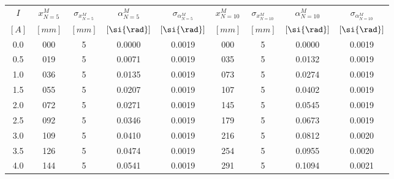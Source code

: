 \begin{tabular}{
    S[table-format=1.1]
    S[table-format=2.0]
    S[table-format=1.0]
    S[table-format=0.4]
    S[table-format=0.4]
    S[table-format=3.0]
    S[table-format=1.0]
    S[table-format=0.4]
    S[table-format=0.4]
} \toprule
{$I$}        & {$x^M_{N=5}$} & {$\sigma_{x^M_{N=5}}$} & {$\alpha^M_{N=5}$} & {$\sigma_{\alpha^M_{N=5}}$} & {$x^M_{N=10}$} & {$\sigma_{x^M_{N=10}}$} & {$\alpha^M_{N=10}$} & {$\sigma_{\alpha^M_{N=10}}$} \\
{$[\si{A}]$} & {$[\si{mm}]$} & {$[\si{mm}]$}          & {$[\si{\rad}]$}    & {$[\si{\rad}]$}             & {$[\si{mm}]$}  & {$[\si{mm}]$}           & {$[\si{\rad}]$}     & {$[\si{\rad}]$}              \\           & 000           & 5                      & 0.0000             & 0.0019                      & 000            & 5                       & 0.0000              & 0.0019                       \\
0.5          & 019           & 5                      & 0.0071             & 0.0019                      & 035            & 5                       & 0.0132              & 0.0019                       \\
1.0          & 036           & 5                      & 0.0135             & 0.0019                      & 073            & 5                       & 0.0274              & 0.0019                       \\
1.5          & 055           & 5                      & 0.0207             & 0.0019                      & 107            & 5                       & 0.0402              & 0.0019                       \\
2.0          & 072           & 5                      & 0.0271             & 0.0019                      & 145            & 5                       & 0.0545              & 0.0019                       \\
2.5          & 092           & 5                      & 0.0346             & 0.0019                      & 179            & 5                       & 0.0673              & 0.0019                       \\
3.0          & 109           & 5                      & 0.0410             & 0.0019                      & 216            & 5                       & 0.0812              & 0.0020                       \\
3.5          & 126           & 5                      & 0.0474             & 0.0019                      & 254            & 5                       & 0.0955              & 0.0020                       \\
4.0          & 144           & 5                      & 0.0541             & 0.0019                      & 291            & 5                       & 0.1094              & 0.0021                       \\ \bottomrule

\end{tabular}